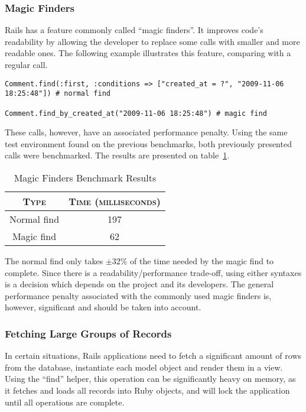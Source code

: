 \subsubsection{Magic Finders}
Rails has a feature commonly called ``magic finders''. It improves code's readability by allowing the developer to replace some calls with smaller and more readable ones. The following example illustrates this feature, comparing with a regular call.
\begin{lstlisting}[xleftmargin=30pt,xrightmargin=30pt]
Comment.find(:first, :conditions => ["created_at = ?", "2009-11-06 18:25:48"]) # normal find

Comment.find_by_created_at("2009-11-06 18:25:48") # magic find
\end{lstlisting}
These calls, however, have an associated performance penalty. Using the same test environment found on the previous benchmarks, both previously presented calls were benchmarked. The results are presented on table~\ref{tab:magic_finders}.
\begin{table}[h!t]
  \centering
  \caption{Magic Finders Benchmark Results}
  \label{tab:magic_finders}
  
  \begin{tabular}{c|c}
  
    \textbf{\textsc{Type}} & \textbf{\textsc{Time (milliseconds)}} \\ \hline
    Normal find & 197 \\ \hline
    Magic find & 62 \\
  \end{tabular}
\end{table}

The normal find only takes $\pm$32\% of the time needed by the magic find to complete. Since there is a readability/performance trade-off, using either syntaxes is a decision which depends on the project and its developers. The general performance penalty associated with the commonly used magic finders is, however, significant and should be taken into account.


\subsubsection{Fetching Large Groups of Records}
In certain situations, Rails applications need to fetch a significant amount of rows from the database, instantiate each model object and render them in a view. Using the ``find'' helper, this operation can be significantly heavy on memory, as it fetches and loads all records into Ruby objects, and will lock the application until all operations are complete.

